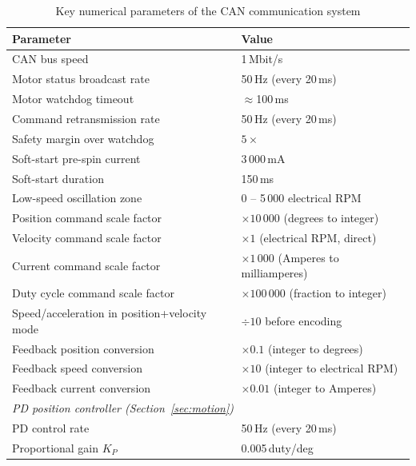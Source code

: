 \documentclass[12pt,a4paper]{article}
\begin{document}
\begin{table}[H]
  \centering
  \caption{Key numerical parameters of the CAN communication system}
  \label{tab:summary}
  \begin{tabular}{ll}
    \toprule
    Parameter & Value \\
    \midrule
    CAN bus speed                                  & 1\,Mbit/s \\
    Motor status broadcast rate                    & 50\,Hz (every 20\,ms) \\
    Motor watchdog timeout                         & $\approx$100\,ms \\
    Command retransmission rate                    & 50\,Hz (every 20\,ms) \\
    Safety margin over watchdog                    & $5\times$ \\
    Soft-start pre-spin current                    & 3\,000\,mA \\
    Soft-start duration                            & 150\,ms \\
    Low-speed oscillation zone                     & 0 -- 5\,000 electrical RPM \\
    Position command scale factor                  & $\times 10\,000$ (degrees to integer) \\
    Velocity command scale factor                  & $\times 1$ (electrical RPM, direct) \\
    Current command scale factor                   & $\times 1\,000$ (Amperes to milliamperes) \\
    Duty cycle command scale factor                & $\times 100\,000$ (fraction to integer) \\
    Speed/acceleration in position+velocity mode   & $\div 10$ before encoding \\
    Feedback position conversion                   & $\times 0.1$ (integer to degrees) \\
    Feedback speed conversion                      & $\times 10$ (integer to electrical RPM) \\
    Feedback current conversion                    & $\times 0.01$ (integer to Amperes) \\
    \midrule
    \multicolumn{2}{l}{\textit{PD position controller (Section~\ref{sec:motion})}} \\
    \midrule
    PD control rate                                & 50\,Hz (every 20\,ms) \\
    Proportional gain $K_P$                        & 0.005\,duty/deg \\

\end{tabular}
\end{table}
\end{document}
